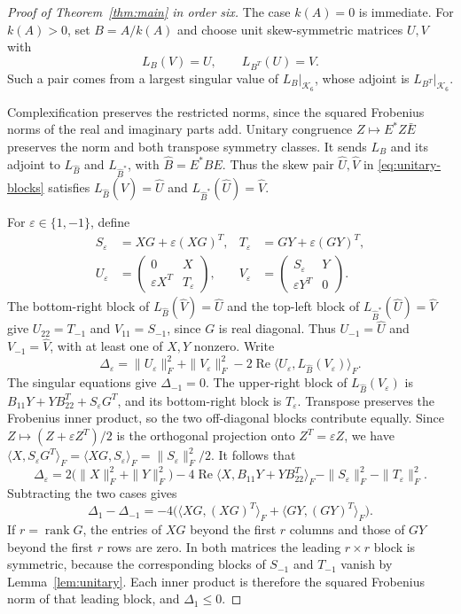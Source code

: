 \documentclass[11pt,letterpaper]{article}
\newcommand{\Skew}{\mathcal K}
\newcommand{\ip}[2]{\langle #1,#2\rangle_F}
\newcommand{\rank}{\operatorname{rank}}
\begin{document}
\begin{proof}[Proof of Theorem~\ref{thm:main} in order six]
The case \(k(A)=0\) is immediate. For \(k(A)>0\), set \(B=A/k(A)\)
and choose unit skew-symmetric matrices \(U,V\) with
\[
L_B(V)=U,\qquad L_{B^T}(U)=V.
\]
Such a pair comes from a largest singular value of \(L_B|_{\Skew_6}\),
whose adjoint is \(L_{B^T}|_{\Skew_6}\).

Complexification preserves the restricted norms, since the squared
Frobenius norms of the real and imaginary parts add.
Unitary congruence \(Z\mapsto E^*Z\bar E\) preserves the norm
and both transpose symmetry classes. It sends \(L_B\) and its
adjoint to \(L_{\widehat B}\) and \(L_{\widehat B^*}\), with
\(\widehat B=E^*BE\). Thus the skew pair \(\widehat U,\widehat V\)
in \eqref{eq:unitary-blocks} satisfies
\(L_{\widehat B}(\widehat V)=\widehat U\) and
\(L_{\widehat B^*}(\widehat U)=\widehat V\).

For \(\varepsilon\in\{1,-1\}\), define
\[
\begin{aligned}
S_\varepsilon&=XG+\varepsilon(XG)^T,&
T_\varepsilon&=GY+\varepsilon(GY)^T,\\
U_\varepsilon&=\begin{pmatrix}0&X\\\varepsilon X^T&T_\varepsilon\end{pmatrix},&
V_\varepsilon&=\begin{pmatrix}S_\varepsilon&Y\\\varepsilon Y^T&0\end{pmatrix}.
\end{aligned}
\]
The bottom-right block of \(L_{\widehat B}(\widehat V)=\widehat U\)
and the top-left block of \(L_{\widehat B^*}(\widehat U)=\widehat V\)
give \(U_{22}=T_{-1}\) and \(V_{11}=S_{-1}\), since \(G\) is real
diagonal. Thus \(U_{-1}=\widehat U\) and \(V_{-1}=\widehat V\),
with at least one of \(X,Y\) nonzero. Write
\[
\Delta_\varepsilon
 =\|U_\varepsilon\|_F^2+\|V_\varepsilon\|_F^2
  -2\operatorname{Re}\ip{U_\varepsilon}{L_{\widehat B}(V_\varepsilon)}.
\]
The singular equations give \(\Delta_{-1}=0\).
The upper-right block of \(L_{\widehat B}(V_\varepsilon)\) is
\(B_{11}Y+YB_{22}^T+S_\varepsilon G^T\), and its bottom-right
block is \(T_\varepsilon\). Transpose preserves the Frobenius
inner product, so the two off-diagonal blocks contribute equally.
Since \(Z\mapsto(Z+\varepsilon Z^T)/2\) is the orthogonal
projection onto \(Z^T=\varepsilon Z\), we have
\(\ip{X}{S_\varepsilon G^T}=\ip{XG}{S_\varepsilon}
=\|S_\varepsilon\|_F^2/2\). It follows that
\[
\Delta_\varepsilon
 =2\bigl(\|X\|_F^2+\|Y\|_F^2\bigr)
  -4\operatorname{Re}\ip{X}{B_{11}Y+YB_{22}^T}
  -\|S_\varepsilon\|_F^2-\|T_\varepsilon\|_F^2 .
\]
Subtracting the two cases gives
\[
\Delta_1-\Delta_{-1}
  =-4\bigl(\ip{XG}{(XG)^T}+\ip{GY}{(GY)^T}\bigr).
\]
If \(r=\rank G\), the entries of \(XG\) beyond the first \(r\)
columns and those of \(GY\) beyond the first \(r\) rows are zero.
In both matrices the leading \(r\times r\) block is symmetric,
because the corresponding blocks of \(S_{-1}\) and \(T_{-1}\)
vanish by Lemma~\ref{lem:unitary}. Each inner product is therefore
the squared Frobenius norm of that leading block, and
\(\Delta_1\le0\).


\end{proof}
\end{document}
